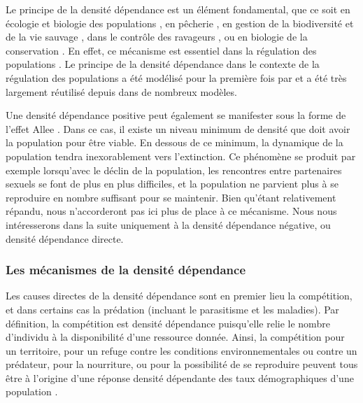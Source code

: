 Le principe de la densité dépendance est un élément fondamental, que ce soit en
écologie et biologie des populations \autocites{kingsland1995a}, en pêcherie
\autocites{rose2001a}, en gestion de la biodiversité et de la vie sauvage
\autocites{gordon2004a}, dans le contrôle des ravageurs \autocites{walde1988a},
ou en biologie de la conservation \autocites{ginzburg1990a}. En effet, ce mécanisme est
essentiel dans la régulation des populations \autocites{murdoch1994a,
turchin1990a}. Le principe de la densité dépendance dans le contexte de la
régulation des populations a été modélisé pour la première fois par
\textcite{verhulst1838a} et a été très largement réutilisé depuis dans de
nombreux modèles. 

Une densité dépendance positive peut également se manifester sous la forme de
l'effet Allee \autocites{courchamp1999a}. Dans ce cas, il existe un niveau
minimum de densité que doit avoir la population pour être viable. En dessous de
ce minimum, la dynamique de la population tendra inexorablement vers
l'extinction. Ce phénomène se produit par exemple lorsqu'avec le déclin de la
population, les rencontres entre partenaires sexuels se font de plus en plus
difficiles, et la population ne parvient plus à se reproduire en nombre
suffisant pour se maintenir. Bien qu'étant relativement répandu, nous
n'accorderont pas ici plus de place à ce mécanisme. Nous nous intéresserons dans
la suite uniquement à la densité dépendance négative, ou densité dépendance
directe. 

\subsubsection{Les mécanismes de la densité dépendance}

Les causes directes de la densité dépendance sont en premier lieu la
compétition, et dans certains cas la prédation (incluant le parasitisme et les
maladies). Par définition, la compétition est densité dépendance puisqu'elle
relie le nombre d'individu à la disponibilité d'une ressource donnée. Ainsi, la
compétition pour un territoire, pour un refuge contre les conditions
environnementales ou contre un prédateur, pour la nourriture, ou pour la
possibilité de se reproduire peuvent tous être à l'origine d'une réponse densité
dépendante des taux démographiques d'une population
\autocites{keddy1989a,begon2009a}.

